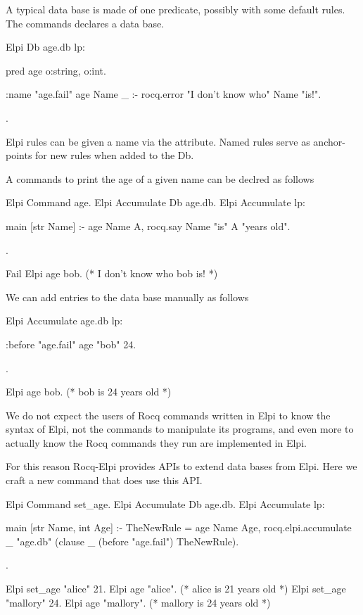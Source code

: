 \documentclass[a4paper, 11pt]{book}
\begin{document}
A typical data base is made of one predicate, possibly with some default
rules. The  commands declares a data base.

\begin{rocqcode}
Elpi Db age.db lp:{{
  pred age o:string, o:int.

  :name "age.fail"
  age Name _ :- rocq.error "I don't know who" Name "is!".
}}.
\end{rocqcode}

Elpi rules can be given a name via the  attribute.
Named rules serve as anchor-points for new rules when added to the Db.

A commands to print the age of a given name can be declred as follows

\begin{rocqcode}
Elpi Command age.
Elpi Accumulate Db age.db.
Elpi Accumulate lp:{{

  main [str Name] :-
    age Name A,
    rocq.say Name "is" A "years old".

}}.

Fail Elpi age bob. (* I don't know who bob is! *)
\end{rocqcode}

We can add entries to the data base manually as follows

\begin{rocqcode}
Elpi Accumulate age.db lp:{{

  :before "age.fail"     %
  age "bob" 24.

}}.

Elpi age bob. (* bob is 24 years old *)
\end{rocqcode}

We do not expect the users of Rocq commands written in Elpi to know the
syntax of Elpi, not the commands to manipulate its programs, and even more
to actually know the Rocq commands they run are implemented in Elpi.

For this reason Rocq-Elpi provides APIs to extend data bases from Elpi.
Here we craft a new command  that does use this API.

\begin{rocqcode}
Elpi Command set_age.
Elpi Accumulate Db age.db.
Elpi Accumulate lp:{{

  main [str Name, int Age] :-
    TheNewRule = age Name Age,
    rocq.elpi.accumulate _ "age.db"
      (clause _ (before "age.fail") TheNewRule).

}}.

Elpi set_age "alice" 21.
Elpi age "alice". (* alice is 21 years old *)
Elpi set_age "mallory" 24.
Elpi age "mallory". (* mallory is 24 years old *)
\end{rocqcode}
\end{document}
